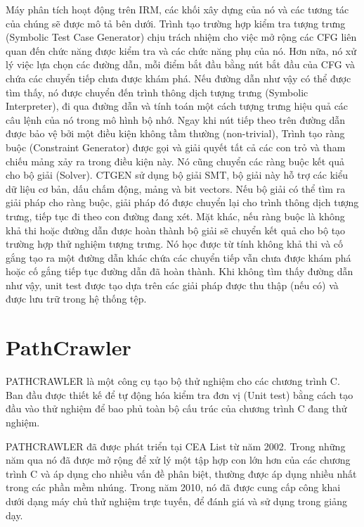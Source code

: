\documentclass[12pt,a4paper]{report}
\begin{document}
\indent Máy phân tích hoạt động trên IRM, các khối xây dựng của nó và các tương tác của chúng sẽ được mô tả bên dưới. Trình tạo trường hợp kiểm tra tượng trưng (Symbolic Test Case Generator) chịu trách nhiệm cho việc mở rộng các CFG liên quan đến chức năng được kiểm tra và các chức năng phụ của nó. Hơn nữa, nó xử lý việc lựa chọn các đường dẫn, mỗi điểm bắt đầu bằng nút bắt đầu của CFG và chứa các chuyển tiếp chưa được khám phá. Nếu đường dẫn như vậy có thể được tìm thấy, nó được chuyển đến trình thông dịch tượng trưng (Symbolic Interpreter), đi qua đường dẫn và tính toán một cách tượng trưng hiệu quả các câu lệnh của nó trong mô hình bộ nhớ. Ngay khi nút tiếp theo trên đường dẫn được bảo vệ bởi một điều kiện không tầm thường (non-trivial), Trình tạo ràng buộc (Constraint Generator) được gọi và giải quyết tất cả các con trỏ và tham chiếu mảng xảy ra trong điều kiện này. Nó cũng chuyển các ràng buộc kết quả cho bộ giải (Solver). CTGEN sử dụng bộ giải SMT, bộ giải này hỗ trợ các kiểu dữ liệu cơ bản, dấu chấm động, mảng và bit vectors. Nếu bộ giải có thể tìm ra giải pháp cho ràng buộc, giải pháp đó được chuyển lại cho trình thông dịch tượng trưng, tiếp tục đi theo con đường đang xét. Mặt khác, nếu ràng buộc là không khả thi hoặc đường dẫn được hoàn thành bộ giải sẽ chuyển kết quả cho bộ tạo trường hợp thử nghiệm tượng trưng. Nó học được từ tính không khả thi và cố gắng tạo ra một đường dẫn khác chứa các chuyển tiếp vẫn chưa được khám phá hoặc cố gắng tiếp tục đường dẫn đã hoàn thành. Khi không tìm thấy đường dẫn như vậy, unit test được tạo dựa trên các giải pháp được thu thập (nếu có) và được lưu trữ trong hệ thống tệp. 
\section{PathCrawler}
PATHCRAWLER là một công cụ tạo bộ thử nghiệm cho các chương trình C. Ban đầu được thiết kế để tự động hóa  kiểm tra đơn vị (Unit test) bằng cách tạo đầu vào thử nghiệm để bao phủ toàn bộ cấu trúc của chương trình C đang thử nghiệm.

\indent PATHCRAWLER đã được phát triển tại CEA List từ năm 2002. Trong những năm qua nó đã được mở rộng để xử lý một tập hợp con lớn hơn của các chương trình C và áp dụng cho nhiều vấn đề phân biệt, thường được áp dụng nhiều nhất trong các phần mềm nhúng. Trong năm 2010, nó đã được cung cấp công khai dưới dạng máy chủ thử nghiệm trực tuyến, để đánh giá và sử dụng trong giảng dạy.
\end{document}
